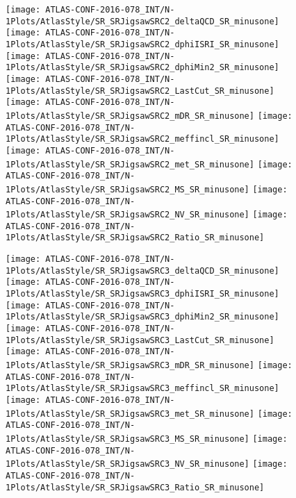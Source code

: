\begin{figure}[tbph]
\begin{center}
\texttt{[image: ATLAS-CONF-2016-078\_INT/N-1Plots/AtlasStyle/SR\_SRJigsawSRC2\_deltaQCD\_SR\_minusone]}
\texttt{[image: ATLAS-CONF-2016-078\_INT/N-1Plots/AtlasStyle/SR\_SRJigsawSRC2\_dphiISRI\_SR\_minusone]}
\texttt{[image: ATLAS-CONF-2016-078\_INT/N-1Plots/AtlasStyle/SR\_SRJigsawSRC2\_dphiMin2\_SR\_minusone]}
\texttt{[image: ATLAS-CONF-2016-078\_INT/N-1Plots/AtlasStyle/SR\_SRJigsawSRC2\_LastCut\_SR\_minusone]}
\texttt{[image: ATLAS-CONF-2016-078\_INT/N-1Plots/AtlasStyle/SR\_SRJigsawSRC2\_mDR\_SR\_minusone]}
\texttt{[image: ATLAS-CONF-2016-078\_INT/N-1Plots/AtlasStyle/SR\_SRJigsawSRC2\_meffincl\_SR\_minusone]}
\texttt{[image: ATLAS-CONF-2016-078\_INT/N-1Plots/AtlasStyle/SR\_SRJigsawSRC2\_met\_SR\_minusone]}
\texttt{[image: ATLAS-CONF-2016-078\_INT/N-1Plots/AtlasStyle/SR\_SRJigsawSRC2\_MS\_SR\_minusone]}
\texttt{[image: ATLAS-CONF-2016-078\_INT/N-1Plots/AtlasStyle/SR\_SRJigsawSRC2\_NV\_SR\_minusone]}
\texttt{[image: ATLAS-CONF-2016-078\_INT/N-1Plots/AtlasStyle/SR\_SRJigsawSRC2\_Ratio\_SR\_minusone]}
\end{center}
\caption{}
\label{fig:SR_SRJigsawSRC1_met_SR_minusone}
\end{figure}

\clearpage
\begin{figure}[tbph]
\begin{center}
\texttt{[image: ATLAS-CONF-2016-078\_INT/N-1Plots/AtlasStyle/SR\_SRJigsawSRC3\_deltaQCD\_SR\_minusone]}
\texttt{[image: ATLAS-CONF-2016-078\_INT/N-1Plots/AtlasStyle/SR\_SRJigsawSRC3\_dphiISRI\_SR\_minusone]}
\texttt{[image: ATLAS-CONF-2016-078\_INT/N-1Plots/AtlasStyle/SR\_SRJigsawSRC3\_dphiMin2\_SR\_minusone]}
\texttt{[image: ATLAS-CONF-2016-078\_INT/N-1Plots/AtlasStyle/SR\_SRJigsawSRC3\_LastCut\_SR\_minusone]}
\texttt{[image: ATLAS-CONF-2016-078\_INT/N-1Plots/AtlasStyle/SR\_SRJigsawSRC3\_mDR\_SR\_minusone]}
\texttt{[image: ATLAS-CONF-2016-078\_INT/N-1Plots/AtlasStyle/SR\_SRJigsawSRC3\_meffincl\_SR\_minusone]}
\texttt{[image: ATLAS-CONF-2016-078\_INT/N-1Plots/AtlasStyle/SR\_SRJigsawSRC3\_met\_SR\_minusone]}
\texttt{[image: ATLAS-CONF-2016-078\_INT/N-1Plots/AtlasStyle/SR\_SRJigsawSRC3\_MS\_SR\_minusone]}
\texttt{[image: ATLAS-CONF-2016-078\_INT/N-1Plots/AtlasStyle/SR\_SRJigsawSRC3\_NV\_SR\_minusone]}
\texttt{[image: ATLAS-CONF-2016-078\_INT/N-1Plots/AtlasStyle/SR\_SRJigsawSRC3\_Ratio\_SR\_minusone]}
\end{center}
\caption{}
\label{fig:SR_SRJigsawSRC2_NV_SR_minusone}
\end{figure}

